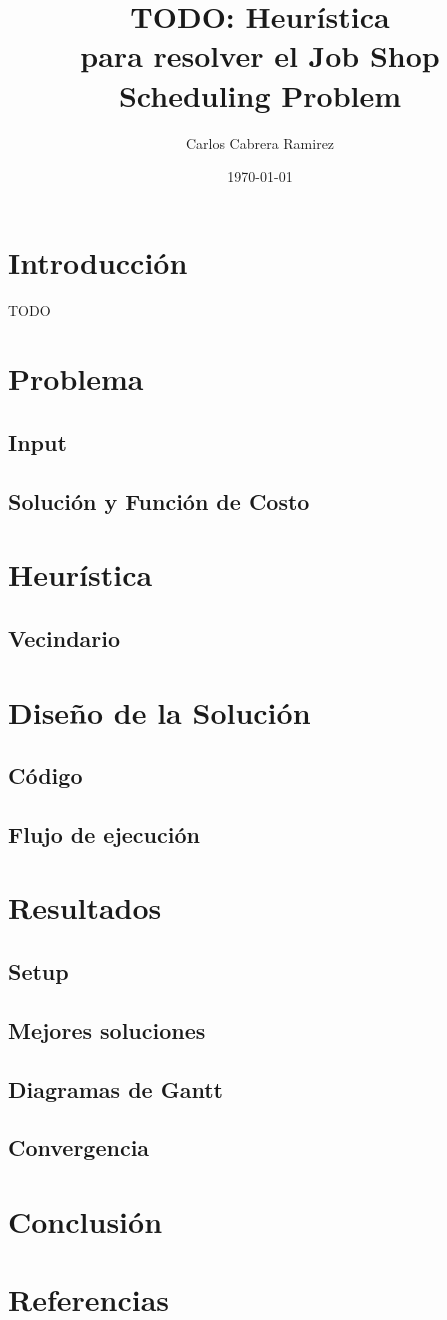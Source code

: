 \documentclass[11pt,letterpaper]{article}
\title{TODO: Heurística \\
       para resolver el Job Shop Scheduling Problem}
\author{Carlos Cabrera Ramirez}
\date{\today}
\begin{document}
\maketitle

\section{Introducción}
TODO

\section{Problema}
\subsection{Input}
\subsection{Solución y Función de Costo}

\section{Heurística}
\subsection{Vecindario}

\section{Diseño de la Solución}
\subsection{Código}
\subsection{Flujo de ejecución}

\section{Resultados}
\subsection{Setup}
\subsection{Mejores soluciones}
\subsection{Diagramas de Gantt}
\subsection{Convergencia}

\section{Conclusión}

\section*{Referencias}
\end{document}
